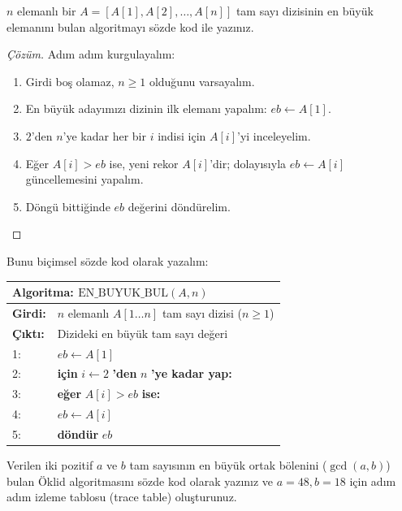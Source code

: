 \begin{example}
$n$ elemanlı bir $A = [A[1], A[2], \dots, A[n]]$ tam sayı dizisinin en büyük elemanını bulan algoritmayı sözde kod ile yazınız.
\end{example}

\begin{proof}[Çözüm]
Adım adım kurgulayalım:
\begin{enumerate}
    \item Girdi boş olamaz, $n \ge 1$ olduğunu varsayalım.
    \item En büyük adayımızı dizinin ilk elemanı yapalım: $eb \leftarrow A[1]$.
    \item $2$'den $n$'ye kadar her bir $i$ indisi için $A[i]$'yi inceleyelim.
    \item Eğer $A[i] > eb$ ise, yeni rekor $A[i]$'dir; dolayısıyla $eb \leftarrow A[i]$ güncellemesini yapalım.
    \item Döngü bittiğinde $eb$ değerini döndürelim.
\end{enumerate}
\end{proof}

Bunu biçimsel sözde kod olarak yazalım:

\begin{center}
\begin{minipage}{1.0\textwidth}
\begin{tabular}{p{2.4cm}p{9.4cm}}
\hline
\multicolumn{2}{l}{\textbf{Algoritma:} $\text{EN\_BUYUK\_BUL}(A, n)$} \\
\hline
\textbf{Girdi:} & $n$ elemanlı $A[1 \dots n]$ tam sayı dizisi ($n \ge 1$) \\
\textbf{Çıktı:} & Dizideki en büyük tam sayı değeri \\
1: & $eb \leftarrow A[1]$ \\
2: & \textbf{için} $i \leftarrow 2$ \textbf{'den} $n$ \textbf{'ye kadar yap:} \\
3: & \quad \textbf{eğer} $A[i] > eb$ \textbf{ise:} \\
4: & \quad \quad $eb \leftarrow A[i]$ \\
5: & \textbf{döndür} $eb$ \\
\hline
\end{tabular}
\end{minipage}
\end{center}

\begin{example}
Verilen iki pozitif $a$ ve $b$ tam sayısının en büyük ortak bölenini ($\gcd(a, b)$) bulan Öklid algoritmasını sözde kod olarak yazınız ve $a = 48, b = 18$ için adım adım izleme tablosu (trace table) oluşturunuz.
\end{example}

